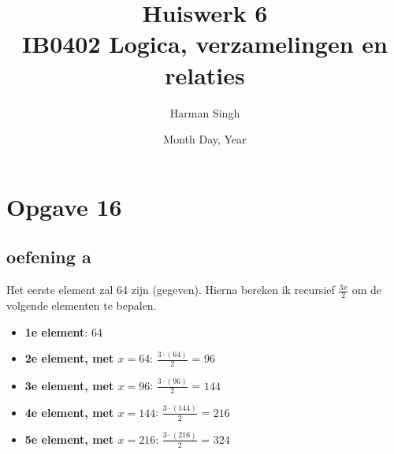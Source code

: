 \documentclass[11pt, a4paper]{article}
\title{Huiswerk 6 \\ IB0402 Logica, verzamelingen en relaties}
\author{Harman Singh}
\date{Month Day, Year}
\begin{document}
\maketitle

\pagebreak
\section*{Opgave 16}
\subsection*{oefening a}






Het eerste element zal 64 zijn (gegeven). Hierna bereken ik recursief $\frac{3x}{2}$ om de volgende elementen te bepalen.

\begin{itemize}
	\item \textbf{1e element}: 64
	\item \textbf{2e element, met $x = 64$}: $\frac{3\cdot(64)}{2}$ = $96$
	\item \textbf{3e element, met $x = 96$}: $\frac{3\cdot(96)}{2}$ = $144$
	\item \textbf{4e element, met $x = 144$}: $\frac{3\cdot(144)}{2}$ = $216$
	\item \textbf{5e element, met $x = 216$}: $\frac{3\cdot(216)}{2}$ = $324$
\end{itemize}
\end{document}
